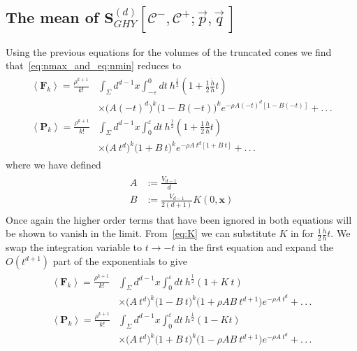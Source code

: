 \documentclass[12pt]{article}
\newcommand{\BF}[1]{\mathbf{F}_{#1}}
\newcommand{\BP}[1]{\mathbf{P}_{#1}}
\begin{document}
\subsection{The mean of $\textbf{S}^{ (d)}_{GHY}\left[\mathcal {C}^-,\mathcal{C}^+;\vec{p},\vec{q}\,\right]$}

Using the previous equations for the volumes of the truncated cones we find that~\eqref{eq:nmax_and_eq:nmin} reduces to
\begin{gather}\label{eq:nmax_and_eq:nmin_volume_expanded}
\begin{aligned}
\left\langle \BF{k}\right\rangle = \frac{\rho^{k+1}}{k!} & \int_{\Sigma}d^{d-1}x\int_{-\varepsilon}^{0}dt\:
h^{\frac{1}{2}}\left (1+
\frac{1}{2}\frac{\dot{h}}{h}t\right)
 \\
 & \times \Big ( A (-t)^d \Big)^k 
 \Big ( 1 - B (-t) \Big)^k
 e^{-\rho A (-t)^d \left[1-B (-t) \right]} + .\,.\,.
\\
\left\langle \BP{k}\right\rangle = \frac{\rho^{k+1}}{k!} & \int_{\Sigma}d^{d-1}x\int_{0}^{\varepsilon}dt\:
h^{\frac{1}{2}}\left (1+
\frac{1}{2}\frac{\dot{h}}{h}t\right)
 \\
 & \times \Big ( A\: t^d \Big)^k 
 \Big ( 1 + B\: t \Big)^k
 e^{-\rho A\: t^d \left[1+B\: t \right]} + .\,.\,.
\end{aligned}
\end{gather}
where we have defined
\begin{gather}\label{A_and_B_defn}
\begin{aligned}
A & := \frac{V_{d-1}}{d} \\
B & := \frac{V_{d-1}}{2 (d+1)}K (0,\mathbf{x})
\end{aligned}
\end{gather}
Once again the higher order terms that have been ignored in both equations will be shown to vanish in the limit. From~\eqref{eq:K} we can substitute $K$ in for $\frac{1}{2}\frac{\dot{h}}{h}t$. We swap the integration variable to $t\rightarrow -t$ in the first equation and expand the $O (t^{d+1})$ part of the exponentials to give
\begin{gather}\label{eq:nmax_and_eq:nmin_volume_expo_expanded}
\begin{aligned}
\left\langle \BF{k}\right\rangle = \frac{\rho^{k+1}}{k!} & \int_{\Sigma}d^{d-1}x\int_{0}^{\varepsilon}dt\:
h^{\frac{1}{2}}\left (1+
K\: t\right)
 \\
 & \times \Big ( A\: t^d \Big)^k 
 \Big ( 1 - B\: t \Big)^k
 \Big ( 1 + \rho A B\: t^{d+1} \Big)
 e^{-\rho A\: t^d} + .\,.\,.
\\
\left\langle \BP{k}\right\rangle = \frac{\rho^{k+1}}{k!} & \int_{\Sigma}d^{d-1}x\int_{0}^{\varepsilon}dt\:
h^{\frac{1}{2}}\left (1-
Kt\right)
 \\
 & \times \Big ( A\: t^d \Big)^k 
 \Big ( 1 + B\: t \Big)^k
  \Big ( 1 - \rho A B\: t^{d+1} \Big)
 e^{-\rho A\: t^d} + .\,.\,.
\end{aligned}
\end{gather}
\end{document}
